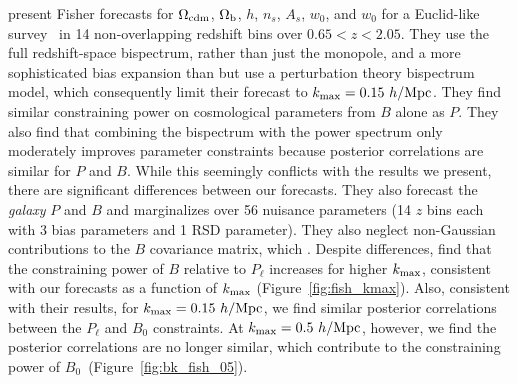 \cite{yankelevich2019} present Fisher forecasts for $\Omega_{\rm cdm}$, 
$\Omega_{\rm b}$, $h$, $n_s$, $A_s$, $w_0$, and $w_0$ for a 
Euclid-like survey~\citep{laureijs2011} in 14 non-overlapping redshift 
bins over $0.65 < z < 2.05$. They use the full redshift-space bispectrum,
rather than just the monopole, and a more sophisticated bias expansion 
than \cite{sefusatti2006} but use a perturbation theory bispectrum model, 
which consequently limit their forecast to $k_{\rm max} = 0.15~h/{\rm Mpc}$. 
They find similar constraining power on cosmological parameters from $B$ 
alone as $P$. They also find that combining the bispectrum with the power 
spectrum only moderately improves parameter constraints because posterior 
correlations are similar for $P$ and $B$. While this seemingly conflicts 
with the results we present, there are significant differences between our 
forecasts. 
They also forecast the {\em galaxy} $P$ and $B$ and marginalizes over 
56 nuisance parameters (14 $z$ bins each with 3 bias parameters and 1 
RSD parameter). They also neglect non-Gaussian contributions to the $B$ 
covariance matrix, which 
.  %
Despite differences, \cite{yankelevich2019} find that the constraining 
power of $B$ relative to $P_\ell$ increases for higher $k_{\rm max}$, consistent 
with our forecasts as a function of $k_{\rm max}$ (Figure~\ref{fig:fish_kmax}). 
Also, consistent with their results, for $k_{\rm max} = 0.15~h/{\rm Mpc}$, 
we find similar posterior correlations between the $P_\ell$ and $B_0$ 
constraints. At $k_{\rm max} = 0.5~h/{\rm Mpc}$, however, we find the posterior 
correlations are no longer similar, which contribute to the constraining
power of $B_0$~(Figure~\ref{fig:bk_fish_05}).


